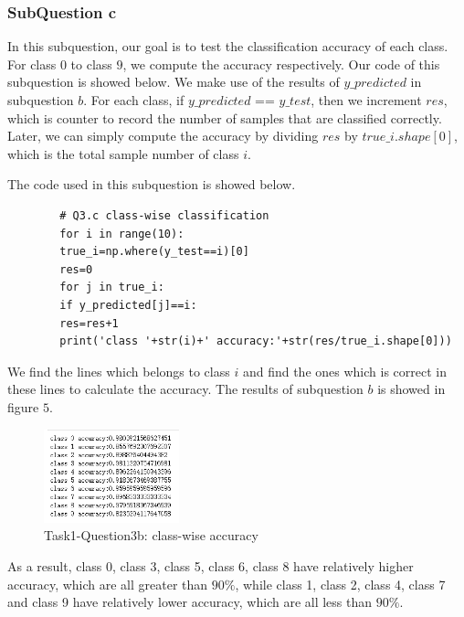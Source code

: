 \documentclass[conference]{IEEEtran}
\begin{document}
	
	
	\subsubsection{SubQuestion c}
	In this subquestion, our goal is to test the classification accuracy of each class. For class $0$ to class $9$, we compute the accuracy respectively. Our code of this subquestion is showed below. We make use of the results of $y\_predicted$ in subquestion $b$. For each class, if $y\_predicted$ == $y\_test$, then we increment $res$, which is counter to record the number of samples that are classified correctly. Later, we can simply compute the accuracy by dividing $res$ by $true\_i.shape[0]$, which is the total sample number of class $i$.\par
	The code used in this subquestion is showed below.
	\begin{lstlisting}
		# Q3.c class-wise classification
		for i in range(10):
		true_i=np.where(y_test==i)[0]
		res=0
		for j in true_i:
		if y_predicted[j]==i:
		res=res+1
		print('class '+str(i)+' accuracy:'+str(res/true_i.shape[0]))
	\end{lstlisting} \par 
	We find the lines which belongs to class $i$ and find the ones which is correct in these lines to calculate the accuracy. The results of subquestion $b$ is showed in figure $5$.\par
	\begin{figure}[h] 
		\centering
		\includegraphics[width=0.35\textwidth]{T1Q3c.png}
		\caption{Task1-Question3b: class-wise accuracy} 
		\label{Fig.t1q3c} 
	\end{figure}
	
	
	As a result, class 0, class 3, class 5, class 6, class 8 have relatively higher accuracy, which are all greater than $90\%$, while class 1, class 2, class 4, class 7 and class 9 have relatively lower accuracy, which are all less than $90\%$.
	
\end{document}
